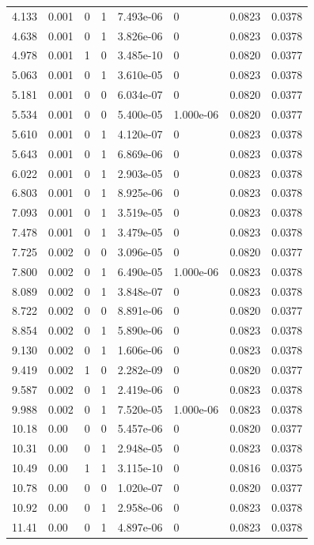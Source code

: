 \documentclass[preview]{standalone}
\begin{document}
{{\begin{tabular}{L{1.2cm}C{1.2cm} C{0.3cm}C{0.5cm} C{1.4cm}C{1.4cm} C{1.4cm}C{1.4cm}}
  4.133  &  0.001  & 0     &  1 &  7.493e-06  & 0  & 0.0823 &  0.0378   \\ 
  4.638  &  0.001  & 0     &  1 &  3.826e-06  & 0  & 0.0823 &  0.0378   \\ 
  4.978  &  0.001  & 1     &  0 &  3.485e-10  & 0  & 0.0820 &  0.0377   \\ 
  5.063  &  0.001  & 0     &  1 &  3.610e-05  & 0  & 0.0823 &  0.0378   \\ 
  5.181  &  0.001  & 0     &  0 &  6.034e-07  & 0  & 0.0820 &  0.0377   \\ 
  5.534  &  0.001  & 0     &  0 &  5.400e-05  & 1.000e-06  & 0.0820 &  0.0377   \\ 
  5.610  &  0.001  & 0     &  1 &  4.120e-07  & 0  & 0.0823 &  0.0378   \\ 
  5.643  &  0.001  & 0     &  1 &  6.869e-06  & 0  & 0.0823 &  0.0378   \\ 
  6.022  &  0.001  & 0     &  1 &  2.903e-05  & 0  & 0.0823 &  0.0378   \\ 
  6.803  &  0.001  & 0     &  1 &  8.925e-06  & 0  & 0.0823 &  0.0378   \\ 
  7.093  &  0.001  & 0     &  1 &  3.519e-05  & 0  & 0.0823 &  0.0378   \\ 
  7.478  &  0.001  & 0     &  1 &  3.479e-05  & 0  & 0.0823 &  0.0378   \\ 
  7.725  &  0.002  & 0     &  0 &  3.096e-05  & 0  & 0.0820 &  0.0377   \\ 
  7.800  &  0.002  & 0     &  1 &  6.490e-05  & 1.000e-06  & 0.0823 &  0.0378   \\ 
  8.089  &  0.002  & 0     &  1 &  3.848e-07  & 0  & 0.0823 &  0.0378   \\ 
  8.722  &  0.002  & 0     &  0 &  8.891e-06  & 0  & 0.0820 &  0.0377   \\ 
  8.854  &  0.002  & 0     &  1 &  5.890e-06  & 0  & 0.0823 &  0.0378   \\ 
  9.130  &  0.002  & 0     &  1 &  1.606e-06  & 0  & 0.0823 &  0.0378   \\ 
  9.419  &  0.002  & 1     &  0 &  2.282e-09  & 0  & 0.0820 &  0.0377   \\ 
  9.587  &  0.002  & 0     &  1 &  2.419e-06  & 0  & 0.0823 &  0.0378   \\ 
  9.988  &  0.002  & 0     &  1 &  7.520e-05  & 1.000e-06  & 0.0823 &  0.0378   \\ 
  10.18  &  0.00  & 0     &  0 &  5.457e-06  & 0  & 0.0820 &  0.0377   \\ 
  10.31  &  0.00  & 0     &  1 &  2.948e-05  & 0  & 0.0823 &  0.0378   \\ 
  10.49  &  0.00  & 1     &  1 &  3.115e-10  & 0  & 0.0816 &  0.0375   \\ 
  10.78  &  0.00  & 0     &  0 &  1.020e-07  & 0  & 0.0820 &  0.0377   \\ 
  10.92  &  0.00  & 0     &  1 &  2.958e-06  & 0  & 0.0823 &  0.0378   \\ 
  11.41  &  0.00  & 0     &  1 &  4.897e-06  & 0  & 0.0823 &  0.0378   \\ 
\hline 
\end{tabular} 

}}
\end{document}
